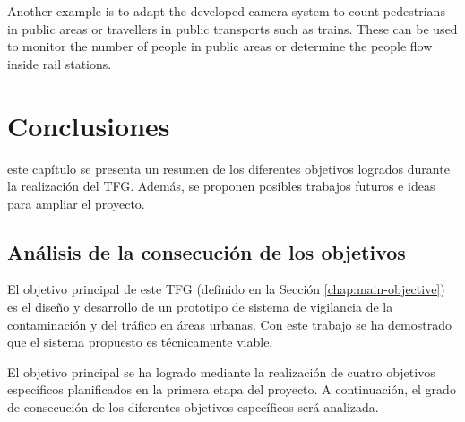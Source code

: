 Another example is to adapt the developed camera system to count pedestrians in public areas or travellers in public transports such as trains. These can be used to monitor the number of people in public areas or determine the people flow inside rail stations.





\chapter{Conclusiones}
\label{chap:conclusiones}

 este capítulo se presenta un resumen de los diferentes objetivos logrados durante la realización del \ac{TFG}. Además, se proponen posibles trabajos futuros e ideas para ampliar el proyecto.

\section{Análisis de la consecución de los objetivos}
El objetivo principal de este \ac{TFG} (definido en la Sección \ref{chap:main-objective}) es el diseño y desarrollo de un prototipo de sistema de vigilancia de la contaminación y del tráfico en áreas urbanas. Con este trabajo se ha demostrado que el sistema propuesto es técnicamente viable.

El objetivo principal se ha logrado mediante la realización de cuatro objetivos específicos planificados en la primera etapa del proyecto. A continuación, el grado de consecución de los diferentes objetivos específicos será analizada.


